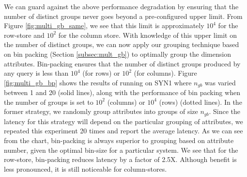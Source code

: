 
We can guard against the above performance degradation by ensuring that the
number of distinct groups never goes beyond a pre-configured upper limit.
From Figure \ref{fig:multi_gb_same}, we see that this limit is approximately
$10^4$ for the row-store and $10^2$ for the column store.
With knowledge of this upper limit on the number of distinct groups, we can now
apply our grouping technique based on bin packing (Section \ref{subsec:mult_gb}) to optimally
group the dimension attributes.
Bin-packing ensures that the number of distinct groups produced by any query is
less than $10^4$ (for rows) or $10^2$ (for columns).
Figure \ref{fig:multi_gb_bp} shows the results of
running on SYN1 where $n_{gb}$ was varied
between 1 and 20 (solid lines), along with the performance
of bin packing when the number of groups is set to $10^2$ (columns) or $10^4$ (rows) (dotted lines).
In the former strategy, we randomly group attributes into groups of size
$n_{gb}$. 
Since the latency for this strategy will depend on the particular grouping of
attributes, we repeated this experiment 20 times and report the average latency.
As we can see from the chart, bin-packing is always superior to grouping
based on attribute number, given the optimal bin-size for a particular system.
We see that for the row-store, bin-packing reduces latency by a factor of 2.5X. 
Although benefit is less pronounced, it is still noticeable for column-stores.



